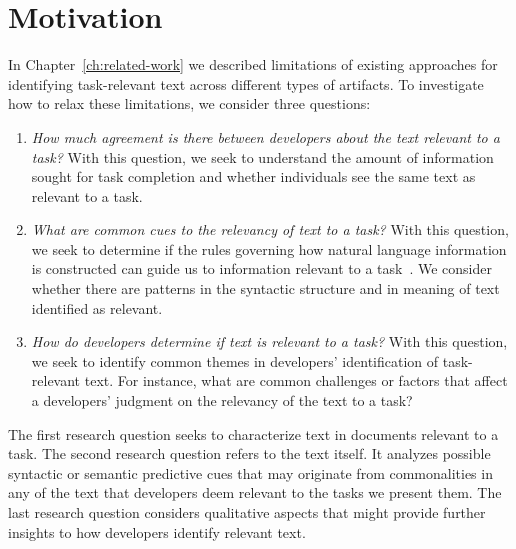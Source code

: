 \section{Motivation}
\label{cp3:method}



In Chapter~\ref{ch:related-work} we described limitations 
of existing approaches for identifying task-relevant 
text across different types of artifacts. 
To investigate how to relax these limitations, we consider three questions:


\begin{enumerate}[label=\textit{RQ\arabic*},leftmargin=*]

    \item \textit{How much agreement is there between developers about the text
    relevant to a task?} With this question, we seek to understand
    the amount of information sought for task completion
    and whether individuals see the same text as
    relevant to a task.

    \item \textit{What are common cues to the relevancy of text to a task?}
    With this question, we seek to determine if the rules governing how natural language information
    is constructed can guide us to information relevant to a task~\cite{Kintsch1978a}.
    We consider whether there
    are patterns in the  syntactic structure and in meaning of text identified as relevant.

    \item \textit{How do developers determine if text is relevant to a task?}
    With this question, we seek to identify common themes in developers' identification of task-relevant text. For instance, what are common challenges or factors that affect a developers' judgment on the relevancy of the text to a task?

\end{enumerate}



The first research question seeks to characterize text
in documents relevant to a task.
The second research question refers to the text itself.
It analyzes possible syntactic or semantic
predictive cues that may originate from commonalities in any of the text that developers deem relevant to the tasks we present them.
The last research question considers qualitative aspects that might provide
further insights to how developers identify relevant text.

